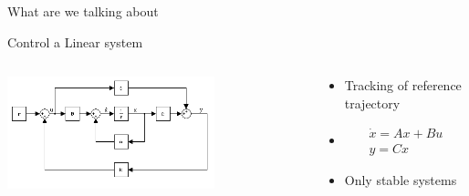 \documentclass[17pt, t, lualatex]{beamer}
\begin{document}
\begin{frame}{What are we talking about}
	\begin{block}{Control a Linear system}
		\begin{columns}[T]
			\begin{column}{0.48\textwidth}
				\begin{center}
					\includegraphics[width=0.7\textwidth]{figures/closed_loop_control.png}
				\end{center}
			
			\end{column}
		
			\begin{column}{0.48\textwidth}
				\begin{itemize}
					\item Tracking of reference trajectory
					\item[] \begin{equation}\begin{aligned}
						\dot{x} = Ax + Bu\\
						y = Cx
						\end{aligned}\end{equation}
					\item Only stable systems
				\end{itemize}	
			\end{column}
		\end{columns}
	\end{block}		
\end{frame}
	
	
	
\end{document}
